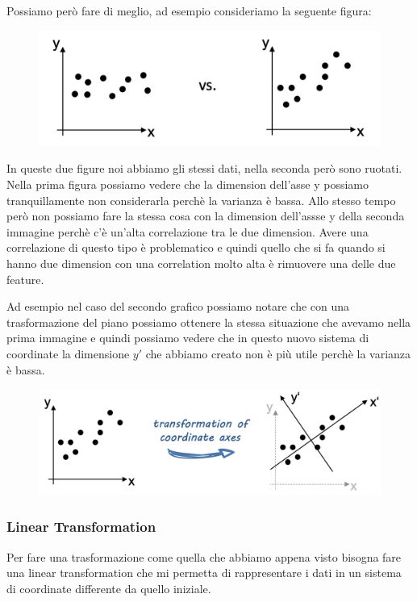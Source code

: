 \documentclass[14pt]{extreport}
\begin{document}
Possiamo però fare di meglio, ad esempio consideriamo la seguente figura:
\begin{figure}[H]
\centering
\includegraphics[width=0.7\linewidth]{437.jpeg}
\end{figure}

In queste due figure noi abbiamo gli stessi dati, nella seconda però sono ruotati. 
Nella prima figura possiamo vedere che la dimension dell'asse y possiamo tranquillamente non considerarla perchè la varianza è bassa.
Allo stesso tempo però non possiamo fare la stessa cosa con la dimension dell'assse y della seconda immagine perchè c'è un'alta
correlazione tra le due dimension.
Avere una correlazione di questo tipo è problematico e quindi quello che si fa quando si hanno due dimension con una correlation 
molto alta è rimuovere una delle due feature.

Ad esempio nel caso del secondo grafico possiamo notare che con una trasformazione del piano possiamo ottenere la stessa situazione
che avevamo nella prima immagine e quindi possiamo vedere che in questo nuovo sistema di coordinate la dimensione $y'$ che abbiamo creato
non è più utile perchè la varianza è bassa.

\begin{figure}[H]
\centering
\includegraphics[width=0.7\linewidth]{438.jpeg}
\end{figure}

\subsubsection{Linear Transformation}

Per fare una trasformazione come quella che abbiamo appena visto bisogna fare una linear transformation che mi permetta di 
rappresentare i dati in un sistema di coordinate differente da quello iniziale.
\end{document}
